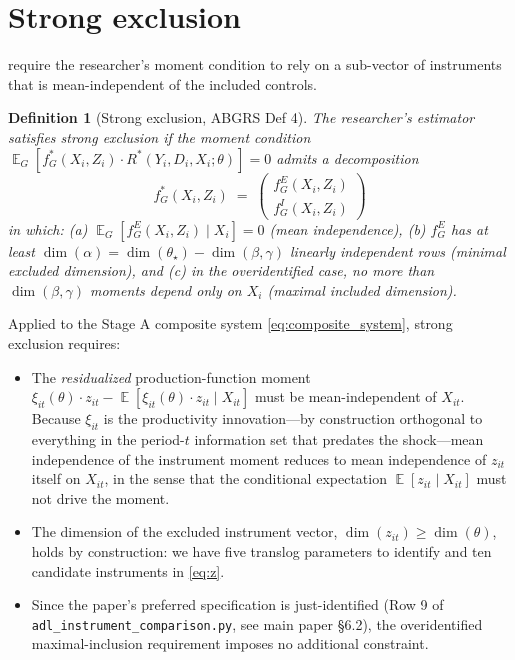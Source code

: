 \documentclass[11pt]{article}
\newtheorem{definition}{Definition}
\DeclareMathOperator{\E}{\mathbb{E}}
\begin{document}
\section{Strong exclusion}\label{sec:strong_exclusion}

\citet[Definition 4, p.~1826]{ABGRS2025} require the researcher's moment condition to rely on a sub-vector of instruments that is mean-independent of the included controls.

\begin{definition}[Strong exclusion, ABGRS Def 4]\label{def:se}
The researcher's estimator satisfies \emph{strong exclusion} if the moment condition $\E_G[f^*_G(X_i,Z_i)\cdot R^*(Y_i,D_i,X_i;\theta)]=0$ admits a decomposition
\begin{equation}\label{eq:se_decomp}
f^*_G(X_i,Z_i) \;=\; \begin{pmatrix} f^E_G(X_i,Z_i) \\ f^I_G(X_i,Z_i) \end{pmatrix}
\end{equation}
in which: (a) $\E_G[f^E_G(X_i,Z_i) \mid X_i] = 0$ (mean independence), (b) $f^E_G$ has at least $\dim(\alpha) = \dim(\theta_\star) - \dim(\beta,\gamma)$ linearly independent rows (minimal excluded dimension), and (c) in the overidentified case, no more than $\dim(\beta,\gamma)$ moments depend only on $X_i$ (maximal included dimension).
\end{definition}

Applied to the Stage A composite system \eqref{eq:composite_system}, strong exclusion requires:
\begin{itemize}
\item[(a)] The \emph{residualized} production-function moment $\xi_{it}(\theta)\cdot z_{it} - \E[\xi_{it}(\theta)\cdot z_{it}\mid X_{it}]$ must be mean-independent of $X_{it}$. Because $\xi_{it}$ is the productivity innovation---by construction orthogonal to everything in the period-$t$ information set that predates the shock---mean independence of the instrument moment reduces to mean independence of $z_{it}$ itself on $X_{it}$, in the sense that the conditional expectation $\E[z_{it}\mid X_{it}]$ must not drive the moment.
\item[(b)] The dimension of the excluded instrument vector, $\dim(z_{it}) \geq \dim(\theta)$, holds by construction: we have five translog parameters to identify and ten candidate instruments in \eqref{eq:z}.
\item[(c)] Since the paper's preferred specification is just-identified (Row 9 of \verb|adl_instrument_comparison.py|, see main paper §6.2), the overidentified maximal-inclusion requirement imposes no additional constraint.
\end{itemize}
\end{document}
